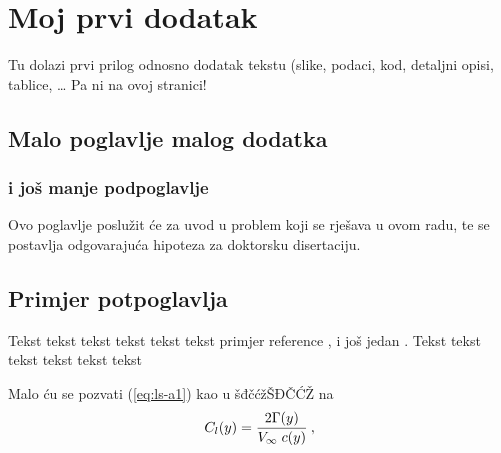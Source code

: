 \documentclass[a4paper,12pt]{report}
\def\Vinf{\hbox{$V_{\infty}$}} %
\begin{document}
\clearpage
{} %








\appendix
\chapter{Moj prvi dodatak}
Tu dolazi prvi prilog odnosno dodatak tekstu (slike, podaci, kod, detaljni
opisi, tablice, \ldots
\newpage 
Pa ni na ovoj stranici!
\section{Malo poglavlje malog dodatka}
\subsection{i još manje podpoglavlje}
Ovo poglavlje poslu\v{z}it \'{c}e za uvod u problem koji se rje\v{s}ava u ovom
radu, te se postavlja odgovaraju\'{c}a hipoteza za doktorsku
disertaciju.

\section{Primjer potpoglavlja}
Tekst tekst tekst tekst tekst tekst primjer reference
\cite{mastersthesis-minimal}, i jo\v{s} jedan \cite{inbook-full}.
Tekst tekst tekst tekst tekst tekst 

Malo ću se pozvati (\eqref{eq:ls-a1}) kao u šđčćžŠĐČĆŽ na 
\begin{equation}\label{eq:ls-a1}
	C_l(y)=\frac{2\Gamma(y)}{\Vinf\;c(y)}\:,
\end{equation}
%
\end{document}
